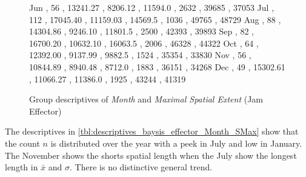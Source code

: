 \begin{figure}[ht!]
\begin{minipage}{0.55\textwidth}
{			Jun , 56  , 13241.27 , 8206.12  , 11594.0 , 2632 , 39685 , 37053 
			Jul , 112 , 17045.40 , 11159.03 , 14569.5 , 1036 , 49765 , 48729 
			Aug , 88  , 14304.86 , 9246.10  , 11801.5 , 2500 , 42393 , 39893 
			Sep , 82  , 16700.20 , 10632.10 , 16063.5 , 2006 , 46328 , 44322 
			Oct , 64  , 12392.00 , 9137.99  , 9882.5  , 1524 , 35354 , 33830 
			Nov , 56  , 10844.89 , 8940.48  , 8712.0  , 1883 , 36151 , 34268 
			Dec , 49  , 15302.61 , 11066.27 , 11386.0 , 1925 , 43244 , 41319 
		}\data
		\tiny
		\centering
		\label{fig:descriptives_baysis_effector_Month_SMax}
	\end{minipage}%
	\caption{Group descriptives of \textit{Month} and \textit{Maximal Spatial Extent} (Jam Effector)}
\end{figure}
The descriptives in \cref{tbl:descriptives_baysis_effector_Month_SMax} show that the count $n$ is distributed over the year with a peek in July and low in January. The November shows the shorts spatial length when the July show the longest length in $\bar{x}$ and $\sigma$. There is no distinctive general trend.

